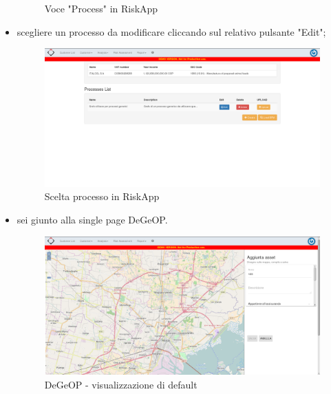 \begin{itemize}
\begin{figure}[H]
		\caption{Voce "Process" in RiskApp}
		\end{figure}
	\item scegliere un processo da modificare cliccando sul relativo pulsante "Edit";
		\begin{figure}[H]
		\centering
		\includegraphics[width=\textwidth]{img/accessoDeGeOP/s5-select_process.png}
		\caption{Scelta processo in RiskApp}
		\end{figure}
	\item sei giunto alla single page DeGeOP.
		\begin{figure}[H]
		\centering
		\includegraphics[width=\textwidth]{img/accessoDeGeOP/s6-DeGeOP.png}
		\caption{DeGeOP - visualizzazione di default}
		\end{figure}
\end{itemize}

